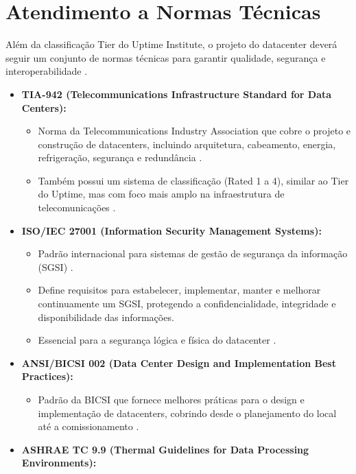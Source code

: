 \documentclass[
	12pt,				%
	oneside,			%
	a4paper,			%
	english,			%
	brazil				%
	]{abntex2unama}
\begin{document}
\section{Atendimento a Normas Técnicas}
Além da classificação Tier do Uptime Institute, o projeto do datacenter deverá seguir um conjunto de normas técnicas para garantir qualidade, segurança e interoperabilidade \cite{datacenter_security}.
\begin{itemize}
	\item \textbf{TIA-942 (Telecommunications Infrastructure Standard for Data Centers):}
	      \begin{itemize}
		      \item Norma da Telecommunications Industry Association que cobre o projeto e construção de datacenters, incluindo arquitetura, cabeamento, energia, refrigeração, segurança e redundância \cite{datacenter_networking}.
		      \item Também possui um sistema de classificação (Rated 1 a 4), similar ao Tier do Uptime, mas com foco mais amplo na infraestrutura de telecomunicações \cite{network_fabric}.
	      \end{itemize}
	\item \textbf{ISO/IEC 27001 (Information Security Management Systems):}
	      \begin{itemize}
		      \item Padrão internacional para sistemas de gestão de segurança da informação (SGSI) \cite{datacenter_security}.
		      \item Define requisitos para estabelecer, implementar, manter e melhorar continuamente um SGSI, protegendo a confidencialidade, integridade e disponibilidade das informações.
		      \item Essencial para a segurança lógica e física do datacenter \cite{reliability_engineering}.
	      \end{itemize}
	\item \textbf{ANSI/BICSI 002 (Data Center Design and Implementation Best Practices):}
	      \begin{itemize}
		      \item Padrão da BICSI que fornece melhores práticas para o design e implementação de datacenters, cobrindo desde o planejamento do local até a comissionamento \cite{design_principles}.
	      \end{itemize}
	\item \textbf{ASHRAE TC 9.9 (Thermal Guidelines for Data Processing Environments):}
	      \begin{itemize}

\end{itemize}
\end{itemize}
\end{document}
